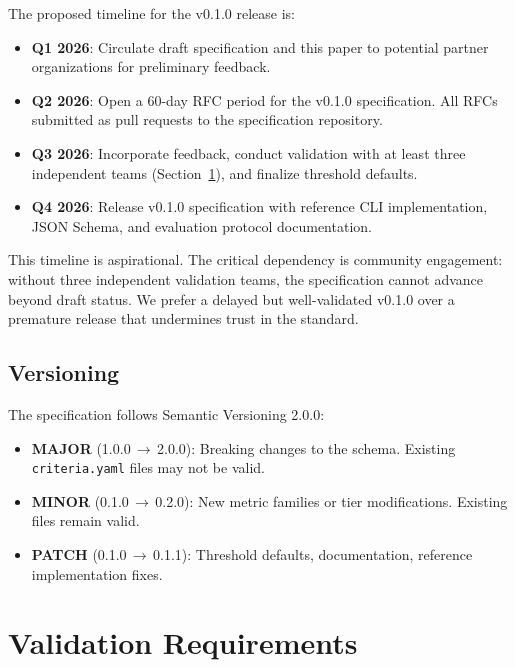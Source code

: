 \documentclass[11pt]{article}
\newcommand{\criteriayaml}{\texttt{criteria.yaml}}
\begin{document}
The proposed timeline for the v0.1.0 release is:

\begin{itemize}[leftmargin=12pt]
  \item \textbf{Q1 2026}: Circulate draft specification and this paper to potential partner organizations for preliminary feedback.
  \item \textbf{Q2 2026}: Open a 60-day RFC period for the v0.1.0 specification. All RFCs submitted as pull requests to the specification repository.
  \item \textbf{Q3 2026}: Incorporate feedback, conduct validation with at least three independent teams (Section~\ref{sec:validation}), and finalize threshold defaults.
  \item \textbf{Q4 2026}: Release v0.1.0 specification with reference CLI implementation, JSON Schema, and evaluation protocol documentation.
\end{itemize}

This timeline is aspirational. The critical dependency is community engagement: without three independent validation teams, the specification cannot advance beyond draft status. We prefer a delayed but well-validated v0.1.0 over a premature release that undermines trust in the standard.

\subsection{Versioning}

The specification follows Semantic Versioning 2.0.0:
\begin{itemize}[leftmargin=12pt]
  \item \textbf{MAJOR} (1.0.0\,$\to$\,2.0.0): Breaking changes to the schema. Existing \criteriayaml{} files may not be valid.
  \item \textbf{MINOR} (0.1.0\,$\to$\,0.2.0): New metric families or tier modifications. Existing files remain valid.
  \item \textbf{PATCH} (0.1.0\,$\to$\,0.1.1): Threshold defaults, documentation, reference implementation fixes.
\end{itemize}


\section{Validation Requirements}
\label{sec:validation}
\end{document}
